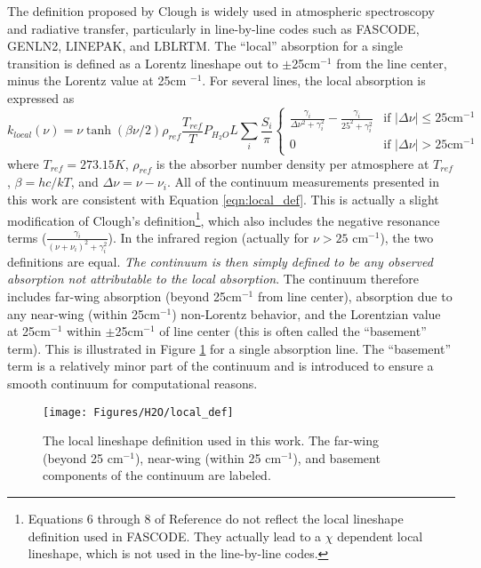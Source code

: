 \documentclass[11pt]{article}
\begin{document}
The definition proposed by Clough is widely used in atmospheric 
spectroscopy and radiative transfer, particularly in line-by-line codes 
such as FASCODE\cite{clo:81}, GENLN2\cite{edw:87}, LINEPAK\cite{gor:94}, 
and LBLRTM.  The ``local''
absorption for a single transition is defined as a Lorentz lineshape out to
$\pm$25cm$^{-1}$ from the line center, minus the Lorentz value at 25cm
$^{-1}$. For several lines, the local absorption is expressed 
as\cite{clo:89}
\begin{equation}
k_{local}(\nu)=\nu\tanh\left(\beta\nu/2\right) \rho_{ref}
\frac{T_{ref}}{T}P_{H_{2}O}L
\sum_i\frac{S_i}{\pi}\left\{\begin{array}{cl}
\frac{\gamma_i}{\Delta\nu^{2}+\gamma_i^2}-\frac{\gamma_i}{25^2+\gamma_i^2}
                        & \mbox{if $|\Delta\nu| \leq 25 \mbox{cm}^{-1}$} \\
        0               & \mbox{if $|\Delta\nu| > 25 \mbox{cm}^{-1}$}
\end{array}\right.
\label{eqn:local_def}
\end{equation}
where $T_{ref}=273.15K$, $\rho_{ref}$ is the absorber number density per
atmosphere at $T_{ref}$, $\beta=hc/kT$, and $\Delta\nu=\nu-\nu_i$.
All of the continuum measurements presented in this work are consistent
with Equation \ref{eqn:local_def}.  
This is actually a slight modification of Clough's
definition\footnote{Equations 6 through 8 of Reference
\protect\cite{clo:89} do not reflect the local lineshape definition used
in FASCODE.  They actually lead to a $\chi$ dependent local lineshape, 
which is not used in the line-by-line codes.}, which
also includes the negative resonance terms ($\frac{\gamma_i}{(\nu+\nu_i)^2
+\gamma_i^2}$).  In the infrared region (actually for $\nu > 25$
cm$^{-1}$), the two definitions are equal.  {\em The continuum is then 
simply defined to be any observed absorption not attributable to the local
absorption}.  The continuum therefore includes 
far-wing absorption (beyond 25cm$^{-1}$ from line center), absorption 
due to any near-wing (within 25cm$^{-1}$) non-Lorentz behavior, and 
the Lorentzian value at 25cm$^{-1}$ within $\pm$25cm$^{-1}$ of line 
center (this is often called the ``basement'' term).  This is illustrated 
in Figure \ref{fig:localdef} for a single absorption line.
The ``basement'' term is a relatively minor part of the continuum and is 
introduced to ensure a smooth continuum for computational reasons.  

\begin{figure}
 \begin{center}
 \texttt{[image: Figures/H2O/local\_def]}
 \end{center}
 \caption[The local lineshape definition.]{The local lineshape definition
 used in this work.  The far-wing (beyond 25 cm$^{-1}$), near-wing (within
 25 cm$^{-1}$), and basement components of the continuum are labeled.}
 \label{fig:localdef}
\end{figure}
\end{document}
